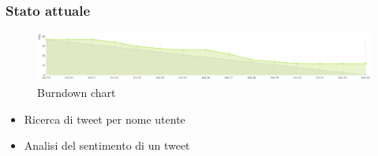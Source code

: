 \documentclass{beamer}
\begin{document}
\begin{frame}
  \frametitle{Stato attuale}
  \begin{figure}
    \centering
    \includegraphics[width=\textwidth]{./img/burndown.png}
    \caption{Burndown chart}
  \end{figure}

  \begin{itemize}
    \item Ricerca di tweet per nome utente
    \item Analisi del sentimento di un tweet
  \end{itemize}
\end{frame}
\end{document}
